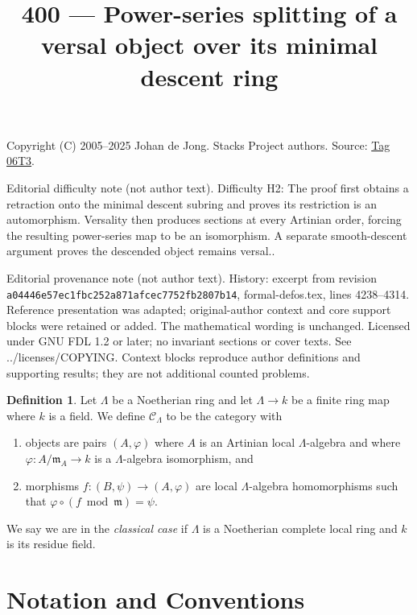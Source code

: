 \documentclass{amsart}
\theoremstyle{plain}
\theoremstyle{definition}
\newtheorem{definition}[subsection]{Definition}
\theoremstyle{remark}
\numberwithin{equation}{subsection}
\begin{document}
\title[Stacks Project, Tag 06T3]{400 --- Power-series splitting of a versal object over its minimal descent ring}
\maketitle
\noindent Copyright (C) 2005--2025 Johan de Jong. Stacks Project authors. Source: \href{https://stacks.math.columbia.edu/tag/06T3}{Tag 06T3}.

\noindent Editorial difficulty note (not author text). Difficulty H2: The proof first obtains a retraction onto the minimal descent subring and proves its restriction is an automorphism. Versality then produces sections at every Artinian order, forcing the resulting power-series map to be an isomorphism. A separate smooth-descent argument proves the descended object remains versal..

\noindent Editorial provenance note (not author text). History: excerpt from revision \texttt{a0444\allowbreak 6e57e\allowbreak c1fbc\allowbreak 252a8\allowbreak 71afc\allowbreak ec775\allowbreak 2fb28\allowbreak 07b14}, formal-defos.tex, lines 4238--4314. Reference presentation was adapted; original-author context and core support blocks were retained or added. The mathematical wording is unchanged. Licensed under GNU FDL 1.2 or later; no invariant sections or cover texts. See ../licenses/COPYING. Context blocks reproduce author definitions and supporting results; they are not additional counted problems.

\begin{definition}
\label{definition-CLambda}
Let $\Lambda$ be a Noetherian ring and let $\Lambda \to k$ be a finite
ring map where $k$ is a field. We define {\it $\mathcal{C}_\Lambda$} to be
the category with
\begin{enumerate}
\item objects are pairs $(A, \varphi)$ where $A$ is an Artinian local
$\Lambda$-algebra and where $\varphi : A/\mathfrak m_A \to k$ is a
$\Lambda$-algebra isomorphism, and
\item morphisms $f : (B, \psi) \to (A, \varphi)$ are local $\Lambda$-algebra
homomorphisms such that $\varphi \circ (f \bmod \mathfrak m) = \psi$.
\end{enumerate}
We say we are in the {\it classical case} if $\Lambda$ is a Noetherian
complete local ring and $k$ is its residue field.
\end{definition}

\section{Notation and Conventions}
\label{section-notations-conventions}
\end{document}

